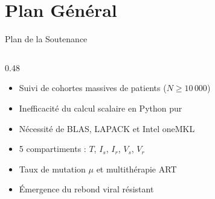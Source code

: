 \documentclass[aspectratio=169, 10pt, french]{beamer}
\begin{document}
\section{Plan Général}
\begin{frame}{Plan de la Soutenance}
    \begin{columns}[t]
        \begin{column}{0.48\textwidth}
            \begin{cadreconcept}
                \small
                \begin{itemize}
                    \item Suivi de cohortes massives de patients ($N \ge 10\,000$)
                    \item Inefficacité du calcul scalaire en Python pur
                    \item Nécessité de BLAS, LAPACK et Intel oneMKL
                \end{itemize}
            \end{cadreconcept}
            \vspace{0.15cm}
            \begin{cadreconcept}
                \small
                \begin{itemize}
                    \item 5 compartiments : $T$, $I_s$, $I_r$, $V_s$, $V_r$
                    \item Taux de mutation $\mu$ et multithérapie ART
                    \item Émergence du rebond viral résistant
                \end{itemize}
            \end{cadreconcept}
        \end{column}


\end{columns}
\end{frame}
\end{document}
